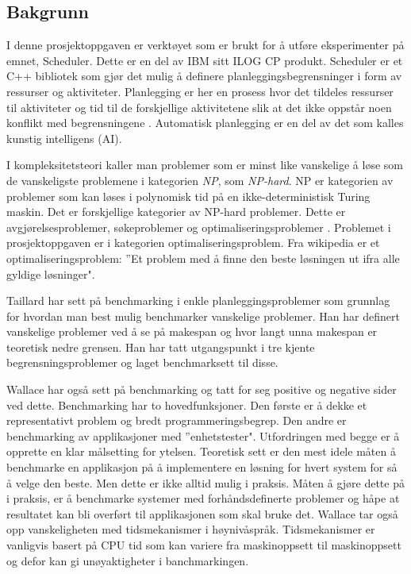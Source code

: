 \subsection{Bakgrunn}
I denne prosjektoppgaven er verktøyet som er brukt for å utføre eksperimenter på emnet, Scheduler. Dette er en del av IBM sitt ILOG CP produkt. Scheduler er et C++ bibliotek som gjør det mulig å definere planleggingsbegrensninger i form av ressurser og aktiviteter. Planlegging er her en prosess hvor det tildeles ressurser til aktiviteter og tid til de forskjellige aktivitetene slik at det ikke oppstår noen konflikt med begrensningene \cite{Pape94implementationof}. Automatisk planlegging er en del av det som kalles kunstig intelligens (AI).

I kompleksitetsteori \cite{compcomplextheory} kaller man problemer som er minst like vanskelige å løse som de vanskeligste problemene i kategorien \textit{NP}, som \textit{NP-hard}. NP er kategorien av problemer som kan løses i polynomisk tid på en ikke-deterministisk Turing maskin. Det er forskjellige kategorier av NP-hard problemer. Dette er avgjørelsesproblemer, søkeproblemer og optimaliseringsproblemer \cite{nphardwikipedia}. Problemet i prosjektoppgaven er i kategorien optimaliseringsproblem. Fra wikipedia \cite{optimizationproblemwiki} er et optimaliseringsproblem: ''Et problem med å finne den beste løsningen ut ifra alle gyldige løsninger".

Taillard \cite{Taillard1993278} har sett på benchmarking i enkle planleggingsproblemer som grunnlag for hvordan man best mulig benchmarker vanskelige problemer. Han har definert vanskelige problemer ved å se på makespan og hvor langt unna makespan er teoretisk nedre grensen. Han har tatt utgangspunkt i tre kjente begrensningsproblemer og laget benchmarksett til disse.

Wallace \cite{Wallace:2004:BCL:956860.956861} har også sett på benchmarking og tatt for seg positive og negative sider ved dette. Benchmarking har to hovedfunksjoner. Den første er å dekke et representativt problem og bredt programmeringsbegrep. Den andre er benchmarking av applikasjoner med ''enhetstester". Utfordringen med begge er å opprette en klar målsetting for ytelsen. Teoretisk sett er den mest idele måten å benchmarke en applikasjon på å implementere en løsning for hvert system for så å velge den beste. Men dette er ikke alltid mulig i praksis. Måten å gjøre dette på i praksis, er å benchmarke systemer med forhåndsdefinerte problemer og håpe at resultatet kan bli overført til applikasjonen som skal bruke det. Wallace tar også opp vanskeligheten med tidsmekanismer i høynivåspråk. Tidsmekanismer er vanligvis basert på CPU tid som kan variere fra maskinoppsett til maskinoppsett og defor kan gi unøyaktigheter i banchmarkingen.
